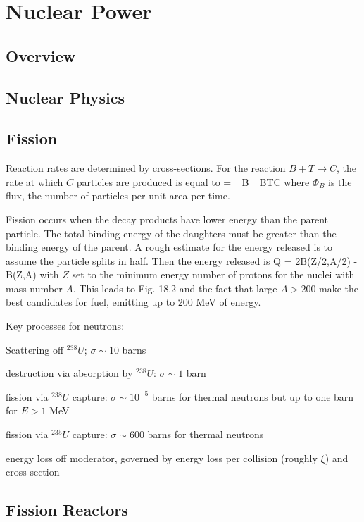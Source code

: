 \documentclass[11pt]{book}
\begin{document}
\chapter{Nuclear Power}

\section{Overview}

\section{Nuclear Physics}

\section{Fission}

Reaction rates are determined by cross-sections. For the reaction $B+T\rightarrow C$, the rate at which $C$ particles are produced is equal to
\be
{} = \Phi_B \sigma_{BT\rightarrow C} \ee
where $\Phi_B$ is the flux, the number of particles per unit area per time. 

Fission occurs when the decay products have lower energy than the parent particle. The total binding energy of the daughters must be greater than the binding energy of the parent. A rough estimate for the energy released is to assume the particle splits in half. Then the energy released is
\be
Q = 2B(Z/2,A/2) - B(Z,A)
\ee
with $Z$ set to the minimum energy number of protons for the nuclei with mass number $A$. This leads to Fig. 18.2 and the fact that large $A>200$ make the best candidates for fuel, emitting up to 200 MeV of energy.

Key processes for neutrons:
\bei
\item Scattering off $^{238}U$; $\sigma\sim 10$ barns
\item destruction via absorption by $^{238}U$: $\sigma\sim 1$ barn
\item fission via $^{238}U$ capture: $\sigma\sim 10^{-5}$ barns for thermal neutrons but up to one barn for $E>1$ MeV
\item fission via $^{235}U$ capture: $\sigma\sim600$ barns for thermal neutrons
\item energy loss off moderator, governed by energy loss per collision (roughly $\xi$) and cross-section
\eei



\section{Fission Reactors}
\end{document}
